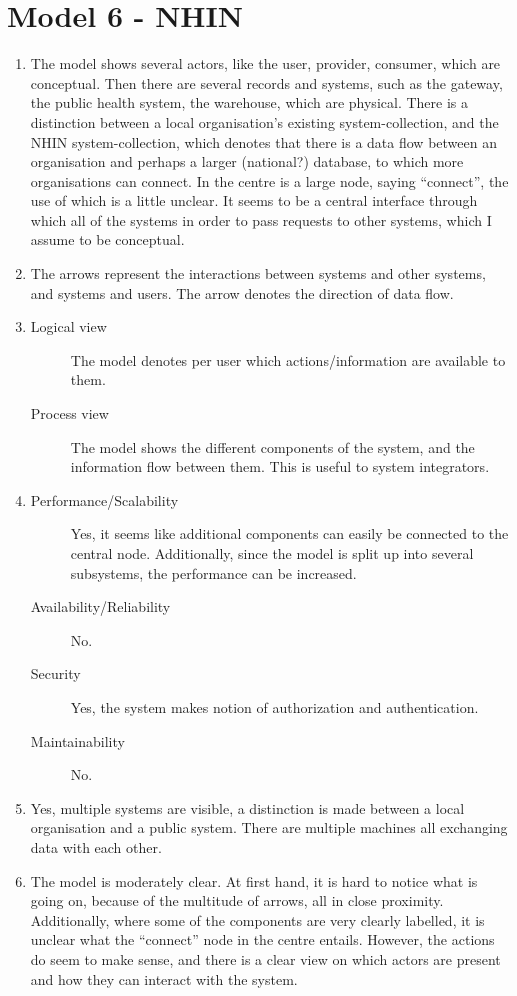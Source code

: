 \section{Model 6 - NHIN}
\begin{enumerate}
	\item The model shows several actors, like the user, provider, consumer, which are conceptual.
	Then there are several records and systems, such as the gateway, the public health system, the warehouse, which are physical.
	There is a distinction between a local organisation's existing system-collection, and the NHIN system-collection, which denotes that there is a data flow between an organisation and perhaps a larger (national?) database, to which more organisations can connect.
	In the centre is a large node, saying ``connect'', the use of which is a little unclear.
	It seems to be a central interface through which all of the systems in order to pass requests to other systems, which I assume to be conceptual.
	
	\item The arrows represent the interactions between systems and other systems, and systems and users.
	The arrow denotes the direction of data flow.
	
	\item
	\begin{description}
		\item[Logical view] The model denotes per user which actions/information are available to them.
		\item[Process view] The model shows the different components of the system, and the information flow between them. This is useful to system integrators.
	\end{description}
	
	\item
	\begin{description}
		\item[Performance/Scalability] Yes, it seems like additional components can easily be connected to the central node.
        Additionally, since the model is split up into several subsystems, the performance can be increased.
		\item[Availability/Reliability] No.
		\item[Security] Yes, the system makes notion of authorization and authentication.
		\item[Maintainability] No.
	\end{description}
	
	\item Yes, multiple systems are visible, a distinction is made between a local organisation and a public system.
	There are multiple machines all exchanging data with each other.
	
	\item The model is moderately clear. At first hand, it is hard to notice what is going on, because of the multitude of arrows, all in close proximity.
	Additionally, where some of the components are very clearly labelled, it is unclear what the ``connect'' node in the centre entails.
	However, the actions do seem to make sense, and there is a clear view on which actors are present and how they can interact with the system.
\end{enumerate} 